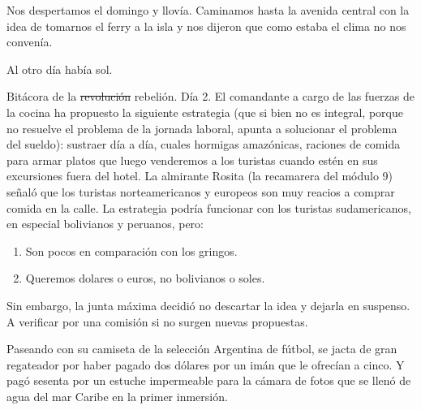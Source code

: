 \documentclass[12pt,twoside,openright,a5paper]{book}
\begin{document}
Nos despertamos el domingo y llovía. Caminamos hasta la avenida central
con la idea de tomarnos el ferry a la isla y nos dijeron que como estaba
el clima no nos convenía.

Al otro día había sol.


\vspace{0.5cm}
\afterpage{}
\hrulefill\hspace{0.2cm} \decofourleft\decofourright \hspace{0.2cm} \hrulefill
\vspace{0.5cm}

Bitácora de la \st{revolución} rebelión. Día 2. El comandante a cargo de las fuerzas de
la cocina ha propuesto la siguiente estrategia (que si bien no es integral,
porque no resuelve el problema de la jornada laboral, apunta a solucionar
el problema del sueldo): sustraer día a día, cuales hormigas amazónicas,
raciones de comida para armar platos que luego venderemos a los turistas
cuando estén en sus excursiones fuera del hotel. La almirante Rosita
(la recamarera del módulo 9) señaló que los turistas norteamericanos
y europeos son muy reacios a comprar comida en la calle. La estrategia
podría funcionar con los turistas sudamericanos, en especial bolivianos
y peruanos, pero:

\begin{enumerate}
\item Son pocos en comparación con los gringos.
\item Queremos dolares o euros, no bolivianos o soles.
\end{enumerate}

Sin embargo, la junta máxima decidió no descartar la idea y dejarla en
suspenso. A verificar por una comisión si no surgen nuevas propuestas.

\vspace{0.5cm}

\hrulefill\hspace{0.2cm} \decofourleft\decofourright \hspace{0.2cm} \hrulefill
\vspace{0.5cm}

Paseando con su camiseta de la selección Argentina de fútbol, se jacta de
gran regateador por haber pagado dos dólares por un imán que le ofrecían
a cinco. Y pagó sesenta por un estuche impermeable para la cámara de fotos
que se llenó de agua del mar Caribe en la primer inmersión.
\end{document}
